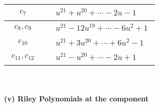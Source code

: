 \documentclass[1p]{elsarticle_modified}
\theoremstyle{definition}
\begin{document}
\begin{tabular}{m{50pt}|m{274pt}}
\hline $$\begin{aligned}c_{7}\end{aligned}$$&$\begin{aligned}
&u^{21}+u^{20}+\cdots-2 u-1
\end{aligned}$\\
\hline $$\begin{aligned}c_{8},c_{9}\end{aligned}$$&$\begin{aligned}
&u^{21}-12 u^{19}+\cdots-6 u^2+1
\end{aligned}$\\
\hline $$\begin{aligned}c_{10}\end{aligned}$$&$\begin{aligned}
&u^{21}+3 u^{20}+\cdots+6 u^2-1
\end{aligned}$\\
\hline $$\begin{aligned}c_{11},c_{12}\end{aligned}$$&$\begin{aligned}
&u^{21}- u^{20}+\cdots-2 u+1
\end{aligned}$\\
\hline
\end{tabular}\\~\\
\newpage\renewcommand{\arraystretch}{1}
\flushleft \textbf{(v) Riley Polynomials at the component}\newline \\
\end{document}
